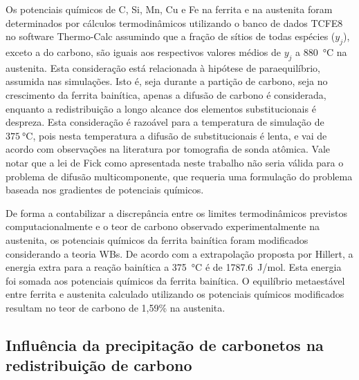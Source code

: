 Os potenciais químicos de C, Si, Mn, Cu e Fe na ferrita e na austenita foram determinados por cálculos termodinâmicos utilizando o banco de dados TCFE8 no software Thermo-Calc\textregistered{} assumindo que a fração de sítios de todas espécies ($y_j$), exceto a do carbono, são iguais aos respectivos valores médios de $y_j$ a \SI{880}{\degreeCelsius} na austenita. Esta consideração está relacionada à hipótese de paraequilíbrio, assumida nas simulações. Isto é, seja durante a partição de carbono, seja no crescimento da ferrita bainítica, apenas a difusão de carbono é considerada, enquanto a redistribuição a longo alcance dos elementos substitucionais é despreza. Esta consideração é razoável para a temperatura de simulação de $\SI{375}{\degreeCelsius}$, pois nesta temperatura a difusão de substitucionais é lenta, e vai de acordo com observações na literatura por tomografia de sonda atômica. %
Vale notar que a lei de Fick como apresentada neste trabalho não seria válida para o problema de difusão multicomponente, que requeria uma formulação do problema baseada nos gradientes de potenciais químicos.

De forma a contabilizar a discrepância entre os limites termodinâmicos previstos computacionalmente e o teor de carbono observado experimentalmente na austenita, os potenciais químicos da ferrita bainítica foram modificados considerando a teoria WBs. De acordo com a extrapolação proposta por Hillert, a energia extra para a reação bainítica a \SI{375}{\degreeCelsius} é de \SI{1787.6}{J/mol}. Esta energia foi somada aos potenciais químicos da ferrita bainítica. O equilíbrio metaestável entre ferrita e austenita calculado utilizando os potenciais químicos modificados resultam no teor de carbono de 1,59\% na austenita. 

\subsection{Influência da precipitação de carbonetos na redistribuição de carbono}

\label{sec:cpartition_sem_bainita}

